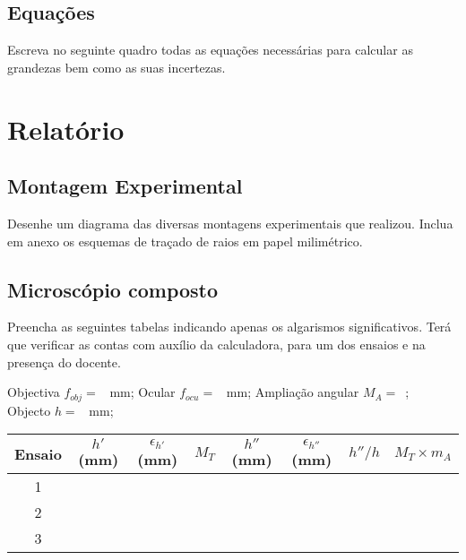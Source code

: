 \documentclass[a4paper,12pt]{article}  %
\begin{document}
\subsection{\sf Equações }
Escreva no seguinte quadro todas as equações necessárias para calcular as grandezas bem como as suas incertezas.
\begin{center}
\framebox[18cm]{\rule{0pt}{8.5cm}}
\end{center}


\section{\sf Relatório}
\subsection{\sf Montagem Experimental}
Desenhe um diagrama das diversas montagens experimentais que realizou. Inclua em anexo os esquemas de traçado de raios em papel milimétrico.

\begin{center}
\framebox[18cm]{\rule{0pt}{10cm}}
\end{center}


\subsection{\sf Microscópio composto}
Preencha as seguintes tabelas indicando  apenas os algarismos significativos. Terá que verificar as contas com auxílio da calculadora, para um dos ensaios e na presença do docente.
\vspace{1 cm}

Objectiva $f_{obj}=$~\underline{\makebox[1cm][r]{~}} mm;
Ocular $f_{ocu}=$~\underline{\makebox[1cm][r]{~}} mm; 
Ampliação angular $M_A=$~\underline{\makebox[1cm][r]{~}};\\
Objecto $h=$~\underline{\makebox[1cm][r]{~}} mm; 

\begin{center}
	\begin{tabular}{|c|c|c|c|c|c||c|c|}
	\hline
	 Ensaio   &  
	 $h'$  (mm) &  
	 $\epsilon_{h'}$ (mm) & 
	 $M_T$  & 
	 $h''$ (mm) & 
	 $\epsilon_{h''}$ (mm) & 
	 $h''/h$ & 
	 $M_T\times m_A$\\
	 
	\hline \hline
	1  &  &  & \quad\quad\quad\quad &  &  &  \makebox[1cm][r]{} &  \makebox[1cm][r]{} \\\cline{1-8}
	 2 &  &  & &  &  &  & \\ \cline{1-8}
	 3 &  &  &  &   & & &\\ \hline
			\end{tabular}
\end{center}
\end{document}

